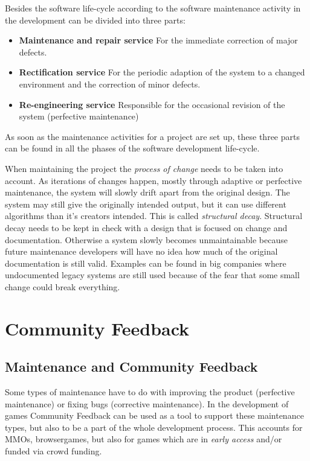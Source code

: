 Besides the software life-cycle according to \citep{sneed_software_2005} the software maintenance activity in the development can be divided into three parts\citep{sneed_software_2005}:
\begin{itemize}
    \item \textbf{Maintenance and repair service} For the immediate correction of major defects.
    
    \item \textbf{Rectification service} For the periodic adaption of the system to a changed environment and the correction of minor defects.
    
    \item \textbf{Re-engineering service} Responsible for the occasional revision of the system (perfective maintenance)
\end{itemize}

As soon as the maintenance activities for a project are set up, these three parts can be found in all the phases of the software development life-cycle.

When maintaining the project the \textit{process of change} needs to be taken into account. As iterations of changes happen, mostly through adaptive or perfective maintenance, the system will slowly drift apart from the original design. The system may still give the originally intended output, but it can use different algorithms than it's creators intended. This is called \textsl{structural decay}.\citep{bcs_software_2015} \newline
Structural decay needs to be kept in check with a design that is focused on change and documentation.\citep{bcs_software_2015} Otherwise a system slowly becomes unmaintainable because future maintenance developers will have no idea how much of the original documentation is still valid. Examples can be found in big companies where undocumented legacy systems are still used because of the fear that some small change could break everything.

\section{Community Feedback}
\label{sec:communityFeedback}

\subsection{Maintenance and Community Feedback}
\label{subsec:maintenanceAndCommunityFeedback}
Some types of maintenance have to do with improving the product (perfective maintenance) or fixing bugs (corrective maintenance). In the development of games Community Feedback can be used as a tool to support these maintenance types, but also to be a part of the whole development process. This accounts for MMOs, browsergames, but also for games which are in \textit{early access} and/or funded via crowd funding.

